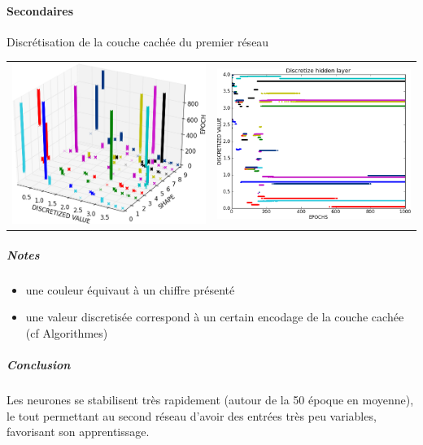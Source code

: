     \paragraph*{Secondaires}
      Discrétisation de la couche cachée du premier réseau
      \begin{center}
	\begin{tabular}{lr}
	  \hspace*{-1cm}
	  \includegraphics[width=250px]{data/expA1/discretize_cloud.png}
	  &
	  \includegraphics[width=250px]{data/expA1/discretize.png} 
	\end{tabular}
      \end{center} 
      \subparagraph*{Notes}
	\begin{itemize}
	  \item une couleur équivaut à un chiffre présenté
	  \item une valeur discretisée correspond à un certain encodage de la couche cachée (cf Algorithmes)
	\end{itemize}
      \subparagraph*{Conclusion}
	Les neurones se stabilisent très rapidement (autour de la 50 époque en moyenne), 
	le tout permettant au second réseau d'avoir des entrées très peu variables, favorisant
	son apprentissage.
